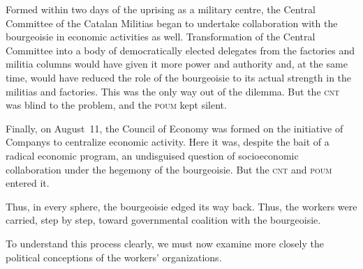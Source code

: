 Formed within two days of the uprising as a military centre, the Central Committee of the Catalan Militias began to undertake collaboration with the bourgeoisie in economic activities as well. Transformation of the Central Committee into a body of democratically elected delegates from the factories and militia columns would have given it more power and authority and, at the same time, would have reduced the role of the bourgeoisie to its actual strength in the militias and factories. This was the only way out of the dilemma. But the \textsc{cnt} was blind to the problem, and the \textsc{poum} kept silent.

Finally, on August~11, the Council of Economy was formed on the initiative of Companys to centralize economic activity. Here it was, despite the bait of a radical economic program, an undisguised question of socioeconomic collaboration under the hegemony of the bourgeoisie. But the \textsc{cnt} and \textsc{poum} entered it.

Thus, in every sphere, the bourgeoisie edged its way back. Thus, the workers were carried, step by step, toward governmental coalition with the bourgeoisie.

To understand this process clearly, we must now examine more closely the political conceptions of the workers’ organizations.